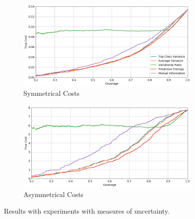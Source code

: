 \begin{figure}[h]
	\centering
	\begin{subfigure}{\textwidth}
		\centering
		\includegraphics[width=\linewidth]{images/multi-class-uncertainity-sym.png}
		\caption{Symmetrical Costs}	
	\end{subfigure}
	\begin{subfigure}{\textwidth}
		\centering
		\includegraphics[width=\linewidth]{images/multi-class-uncertainity-asym.png}
		\caption{Asymmetrical Costs}
	\end{subfigure}
	\caption{Results with experiments with measures of uncertainty.}
	\label{fig:multi-class-uncertainity}
\end{figure}

